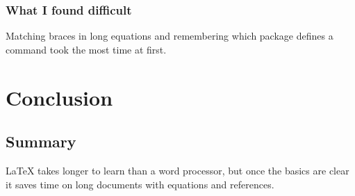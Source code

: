 \documentclass[12pt,a4paper]{report}
\begin{document}
\subsection{What I found difficult}

Matching braces in long equations and remembering which package defines a
command took the most time at first.

\chapter{Conclusion}

\section{Summary}

\LaTeX{} takes longer to learn than a word processor, but once the basics are
clear it saves time on long documents with equations and references.
\end{document}
